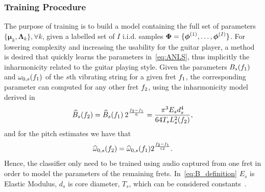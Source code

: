 \documentclass{article}
\begin{document}
\subsubsection{Training Procedure} %
\label{ssub:fast_training}
The purpose of training is to build a model containing the full set of parameters $\{\boldsymbol{\mu}_k, \boldsymbol{\Lambda}_k\}, \forall k$, given a labelled set of $I$ i.i.d. samples $\text{\boldmath$\Phi$}=\{ \text{\boldmath$\phi$}^{(1)},\dots, \text{\boldmath$\phi$}^{(I)} \}$. %
For lowering complexity and increasing the usability for the guitar player, a method is desired that quickly learns the parameters in~\eqref{eq:ANLS}, thus implicitly the inharmonicity related to the guitar playing style. Given the parameters $B_s( f_1 )$ and $\omega_{0,s}( f_1 )$ of the $s$th vibrating string for a given fret $f_1$, the corresponding parameter can computed for any other fret $f_2$, using the inharmonicity model derived in~\cite{barbancho:inharmonicity_tablature}
\begin{equation}\label{eq:B_definition}
    \widehat{B}_s( f_2 ) =  \widehat{B}_s( f_1 ) \: 2^{ \frac{  f_2 - f_1 }{ 6 }} = \frac{ \pi^3 E_s d_s^4 }{ 64 T_s L^2_{s}(f_2) },
\end{equation}
and for the pitch estimates we have that
\begin{equation}\label{eq:omega0_fast}
  \widehat{\omega}_{0,s}( f_2 ) =  \widehat{\omega}_{0,s}( f_1 ) 2^{\frac{f_2-f_1}{12}}.
\end{equation}
Hence, the classifier only need to be trained using audio captured from one fret in order to model the parameters of the remaining frets. In~\eqref{eq:B_definition} $E_s$ is Elastic Modulus, $d_s$ is core diameter, $T_s$, which can be considered constants~\cite{rossing:science_of_string_instruments}. %
\vspace{-.8mm}
\end{document}
